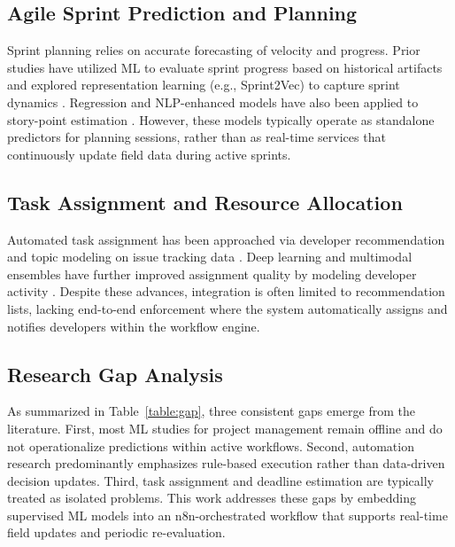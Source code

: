 \documentclass[conference]{IEEEtran}
\begin{document}
\subsection{Agile Sprint Prediction and Planning}
Sprint planning relies on accurate forecasting of velocity and progress. Prior studies have utilized ML to evaluate sprint progress based on historical artifacts \cite{perezcastillo2024_sprint_velocity} and explored representation learning (e.g., Sprint2Vec) to capture sprint dynamics \cite{choetkiertikul2025_sprint2vec}. Regression and NLP-enhanced models have also been applied to story-point estimation \cite{ramessur2021_sprint_effort, yalciner2024_storypoint_sbert}. However, these models typically operate as standalone predictors for planning sessions, rather than as real-time services that continuously update field data during active sprints.

\subsection{Task Assignment and Resource Allocation}
Automated task assignment has been approached via developer recommendation and topic modeling on issue tracking data \cite{diamantopoulos2023_issue_assignment}. Deep learning and multimodal ensembles have further improved assignment quality by modeling developer activity \cite{guo2020_bug_triage, zhang2023_susrec}. Despite these advances, integration is often limited to recommendation lists, lacking end-to-end enforcement where the system automatically assigns and notifies developers within the workflow engine.

\subsection{Research Gap Analysis}
As summarized in Table~\ref{table:gap}, three consistent gaps emerge from the literature. First, most ML studies for project management remain offline and do not operationalize predictions within active workflows. Second, automation research predominantly emphasizes rule-based execution rather than data-driven decision updates. Third, task assignment and deadline estimation are typically treated as isolated problems. This work addresses these gaps by embedding supervised ML models into an n8n-orchestrated workflow that supports real-time field updates and periodic re-evaluation.
\end{document}

